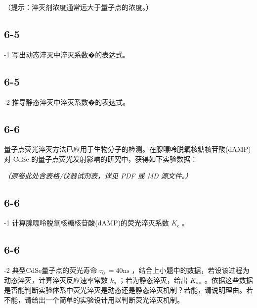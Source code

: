 （提⽰：淬灭剂浓度通常远⼤于量⼦点的浓度。）

\subsection*{6-5}
-1 写出动态淬灭中淬灭系数�的表达式。

\subsection*{6-5}
-2 推导静态淬灭中淬灭系数�的表达式。

\subsection*{6-6}
量⼦点荧光淬灭⽅法已应⽤于⽣物分⼦的检测。在腺嘌呤脱氧核糖核苷酸(dAMP)对 CdSe 的量⼦点荧光发射影响的研究中，获得如下实验数据：

\textit{（原卷此处含表格/仪器试剂表，详见 PDF 或 MD 源文件。）}

\subsection*{6-6}
-1 计算腺嘌呤脱氧核糖核苷酸(dAMP)的荧光淬灭系数 $K _ { \mathfrak { c } }$ 。

\subsection*{6-6}
-2 典型CdSe量⼦点的荧光寿命 $\tau _ { 0 } ~ = 4 0 \mathrm { n s }$ ，结合上⼩题中的数据，若设该过程为动态淬灭，计算淬灭反应速率常数 $k _ { q }$ ；若为静态淬灭，给出 $K _ { s \circ }$ 。依据这些数据是否能判断实验体系中荧光淬灭是动态还是静态淬灭机制？若能，请说明理由。若不能，请给出⼀个简单的实验设计⽤以判断荧光淬灭机制。
